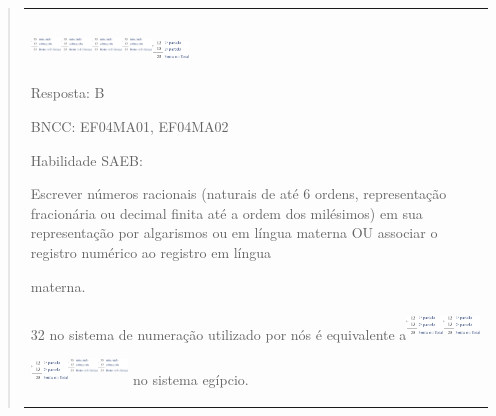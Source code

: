 \begin{enumerate}
\begin{escolha}
\begin{enumerate}
\begin{itemize}
\begin{itemize}
\begin{escolha}
\begin{quote}
\begin{escolha}
{\begin{longtable}[]{@{}l@{}}
\begin{itemize}
\begin{enumerate}
  \includegraphics[width=0.31669in,height=0.41670in]{media/image11.png}\includegraphics[width=0.31669in,height=0.41670in]{media/image11.png}\includegraphics[width=0.31669in,height=0.41670in]{media/image11.png}\includegraphics[width=0.31669in,height=0.41670in]{media/image11.png}\includegraphics[width=0.38337in,height=0.31669in]{media/image10.png}
\end{enumerate}

Resposta: B

BNCC: EF04MA01, EF04MA02

Habilidade SAEB:

Escrever números racionais (naturais de até 6 ordens, representação
fracionária ou decimal finita até a ordem dos milésimos) em sua
representação por algarismos ou em língua materna OU associar o registro
numérico ao registro em língua

materna.

32 no sistema de numeração utilizado por nós é equivalente
a\includegraphics[width=0.38337in,height=0.31669in]{media/image10.png}\includegraphics[width=0.38337in,height=0.31669in]{media/image10.png}\includegraphics[width=0.38337in,height=0.31669in]{media/image10.png}\includegraphics[width=0.31669in,height=0.41670in]{media/image11.png}\includegraphics[width=0.31669in,height=0.41670in]{media/image11.png}
no sistema egípcio.


\end{itemize}
\end{longtable}}
\end{escolha}
\end{quote}
\end{escolha}
\end{itemize}
\end{itemize}
\end{enumerate}
\end{escolha}
\end{enumerate}
